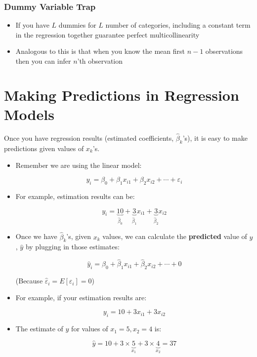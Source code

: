 \documentclass[10pt,article]{article}
\begin{document}
\subsubsection{Dummy Variable Trap}
\label{sec:org0baf2fd}
\begin{itemize}
\item If you have \(L\) dummies for \(L\) number of categories, including
a constant term in the regression together guarantee perfect
multicollinearity

\item Analogous to this is that when you know the mean first \(n-1\) observations then
you can infer \(n\)'th observation
\end{itemize}
\section{Making Predictions in Regression Models}
\label{sec:org0cd39ac}
Once you have regression results (estimated coefficients,
\(\widehat\beta_k\)'s), it is easy to make predictions given values of
\(x_k\)'s.

\begin{itemize}
\item Remember we are using the linear model:

\[ y_i = \beta_0 + \beta_1 x_{i1} + \beta_2 x_{i2} + \cdots + \varepsilon_i \]

\item For example, estimation results can be:

\[ y_i = \underbrace{10}_{\widehat\beta_0} +
           \underbrace{3}_{\widehat\beta_1} x_{i1} + \underbrace{3}_{\widehat\beta_2} 
  x_{i2} \]
\end{itemize}

\begin{itemize}
\item Once we have \(\widehat\beta_k\)'s, given \(x_k\) values, we can
calculate the \textbf{predicted} value of \(y\), \(\widehat y\) by plugging in
those estimates:

\[ \widehat{y}_i = \widehat\beta_0 + \widehat\beta_1 x_{i1} + \widehat\beta_2
     x_{i2} + \cdots + 0 \]

(Because \(\hat{\varepsilon}_i=E[\varepsilon_i]=0\))
\end{itemize}

\begin{itemize}
\item For example, if your estimation results are:

\[ y_i = 10 + 3 x_{i1} + 3 x_{i2} \]
\end{itemize}

\begin{itemize}
\item The estimate of \(y\) for values of \(x_{1} = 5, x_{2} = 4\) is:

\[ \widehat{y} = 10 + 3 \times \underbrace{5}_{x_{1}} + 3 \times \underbrace{4}_{x_{2}} = 37 \]
\end{itemize}
\end{document}
